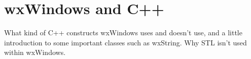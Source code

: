 \chapter{wxWindows and C++}\label{chapcpp}
%
%
\setfooter{\thepage}{}{}{}{}{\thepage}%

What kind of C++ constructs wxWindows uses and doesn't use, and a little introduction to
some important classes such as wxString. Why STL isn't used within wxWindows.

